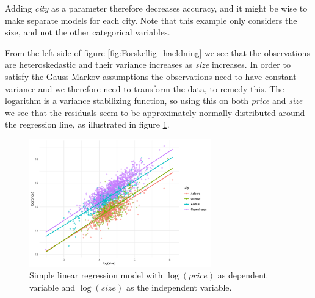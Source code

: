 Adding \textit{city} as a parameter therefore decreases accuracy, and it might be wise to make separate models for each city. 
Note that this example only considers the size, and not the other categorical variables.



From the left side of figure \ref{fig:Forskellig_haeldning} we see that the observations are heteroskedastic and their variance increases as \textit{size} increases. 
In order to satisfy the Gauss-Markov assumptions the observations need to have constant variance and we therefore need to transform the data, to remedy this. 
The logarithm is a variance stabilizing function, so using this on both \textit{price} and \textit{size} we see that the residuals seem to be approximately normally distributed around the regression line, as illustrated in figure \ref{fig:Log_Model_plot}. 

\begin{figure}[H] 
    \centering
    \includegraphics[width = 0.7\textwidth]{figures/Nanna/Plot_forskellig_haeldning.pdf}
    \caption{Simple linear regression model with $\log(price)$ as dependent variable and $\log(size)$ as the independent variable.}
    \label{fig:Log_Model_plot}
\end{figure}

